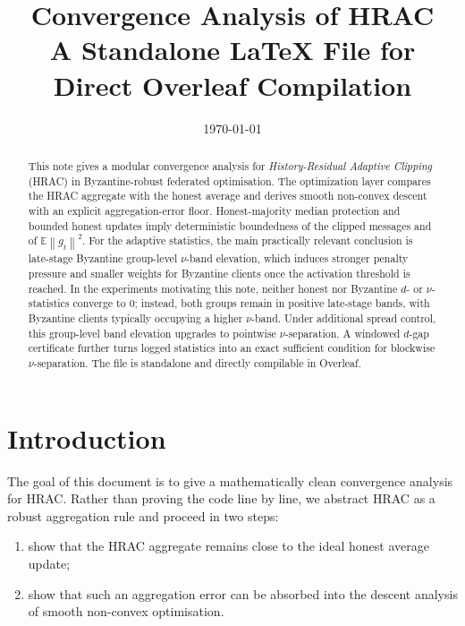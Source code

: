\documentclass[11pt,a4paper]{article}
\title{\textbf{Convergence Analysis of HRAC}\\
\large A Standalone \LaTeX{} File for Direct Overleaf Compilation}
\author{}
\date{\today}
\theoremstyle{remark}
\newcommand{\E}{\mathbb{E}}
\newcommand{\norm}[1]{\left\lVert #1 \right\rVert}
\begin{document}
\maketitle

\begin{abstract}
This note gives a modular convergence analysis for \emph{History-Residual
Adaptive Clipping} (HRAC) in Byzantine-robust federated optimisation. The
optimization layer compares the HRAC aggregate with the honest average and
derives smooth non-convex descent with an explicit aggregation-error floor.
Honest-majority median protection and bounded honest updates imply
deterministic boundedness of the clipped messages and of \(\E\norm{g_t}^2\).
For the adaptive statistics, the main practically relevant conclusion is
late-stage Byzantine group-level \(\nu\)-band elevation, which induces stronger
penalty pressure and smaller weights for Byzantine clients once the activation
threshold is reached. In the experiments motivating this note, neither honest
nor Byzantine \(d\)- or \(\nu\)-statistics converge to \(0\); instead, both
groups remain in positive late-stage bands, with Byzantine clients typically
occupying a higher \(\nu\)-band. Under additional spread control, this
group-level band elevation upgrades to pointwise \(\nu\)-separation. A windowed
\(d\)-gap certificate further turns logged statistics into an exact sufficient
condition for blockwise \(\nu\)-separation. The file is standalone and
directly compilable in Overleaf.
\end{abstract}

\tableofcontents

\section{Introduction}

The goal of this document is to give a mathematically clean convergence
analysis for HRAC. Rather than proving the code line by line, we abstract HRAC
as a robust aggregation rule and proceed in two steps:

\begin{enumerate}[label=\arabic*.]
    \item show that the HRAC aggregate remains close to the ideal honest
    average update;
    \item show that such an aggregation error can be absorbed into the descent
    analysis of smooth non-convex optimisation.
\end{enumerate}
\end{document}
